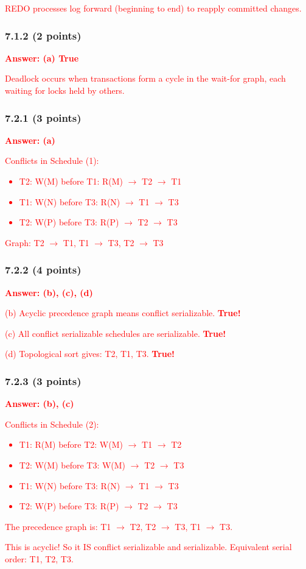 \documentclass[11pt,a4paper]{article}
\begin{document}
\textcolor{red}{REDO processes log forward (beginning to end) to reapply committed changes.}

\subsubsection*{7.1.2 (2 points)}
\textcolor{red}{\textbf{Answer: (a) True}}

\textcolor{red}{Deadlock occurs when transactions form a cycle in the wait-for graph, each waiting for locks held by others.}

\subsubsection*{7.2.1 (3 points)}
\textcolor{red}{\textbf{Answer: (a)}}

\textcolor{red}{Conflicts in Schedule (1):}
\textcolor{red}{\begin{itemize}
\item T2: W(M) before T1: R(M) $\rightarrow$ T2 $\rightarrow$ T1
\item T1: W(N) before T3: R(N) $\rightarrow$ T1 $\rightarrow$ T3
\item T2: W(P) before T3: R(P) $\rightarrow$ T2 $\rightarrow$ T3
\end{itemize}}

\textcolor{red}{Graph: T2 $\rightarrow$ T1, T1 $\rightarrow$ T3, T2 $\rightarrow$ T3}

\subsubsection*{7.2.2 (4 points)}
\textcolor{red}{\textbf{Answer: (b), (c), (d)}}

\textcolor{red}{(b) Acyclic precedence graph means conflict serializable. \textbf{True!}}

\textcolor{red}{(c) All conflict serializable schedules are serializable. \textbf{True!}}

\textcolor{red}{(d) Topological sort gives: T2, T1, T3. \textbf{True!}}

\subsubsection*{7.2.3 (3 points)}
\textcolor{red}{\textbf{Answer: (b), (c)}}

\textcolor{red}{Conflicts in Schedule (2):}
\textcolor{red}{\begin{itemize}
\item T1: R(M) before T2: W(M) $\rightarrow$ T1 $\rightarrow$ T2
\item T2: W(M) before T3: W(M) $\rightarrow$ T2 $\rightarrow$ T3
\item T1: W(N) before T3: R(N) $\rightarrow$ T1 $\rightarrow$ T3
\item T2: W(P) before T3: R(P) $\rightarrow$ T2 $\rightarrow$ T3
\end{itemize}}

\textcolor{red}{The precedence graph is: T1 $\rightarrow$ T2, T2 $\rightarrow$ T3, T1 $\rightarrow$ T3.}

\textcolor{red}{This is acyclic! So it IS conflict serializable and serializable. Equivalent serial order: T1, T2, T3.}
\end{document}
